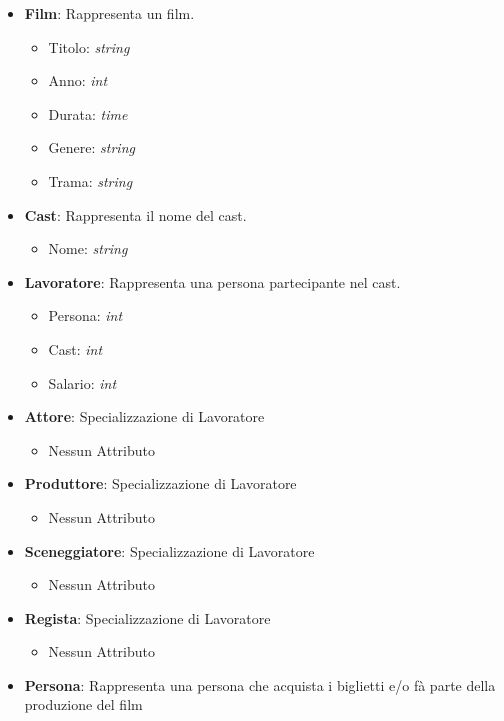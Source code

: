 \documentclass[10pt]{article}
\begin{document}
\begin{itemize}
		\item \textbf{Film}: Rappresenta un film.
		\begin{itemize}
			\item Titolo: \textit{string}
			\item Anno: \textit{int}
			\item Durata: \textit{time}
			\item Genere: \textit{string}
			\item Trama: \textit{string}
		\end{itemize}
		\item \textbf{Cast}: Rappresenta il nome del cast.
		\begin{itemize}
			\item Nome: \textit{string}
		\end{itemize}
		\item \textbf{Lavoratore}: Rappresenta una persona partecipante nel cast.
		\begin{itemize}
			\item Persona: \textit{int}
			\item Cast: \textit{int}
			\item Salario: \textit{int}
		\end{itemize}
		\item \textbf{Attore}: Specializzazione di Lavoratore
		\begin{itemize}
			\item Nessun Attributo
		\end{itemize}
		\item \textbf{Produttore}: Specializzazione di Lavoratore
		\begin{itemize}
			\item Nessun Attributo
		\end{itemize}
		\item \textbf{Sceneggiatore}: Specializzazione di Lavoratore
		\begin{itemize}
			\item Nessun Attributo
		\end{itemize}
		\item \textbf{Regista}: Specializzazione di Lavoratore
		\begin{itemize}
			\item Nessun Attributo
		\end{itemize}
		\item \textbf{Persona}: Rappresenta una persona che acquista i biglietti e/o fà parte della produzione del film
		\begin{itemize}

\end{itemize}
\end{itemize}
\end{document}
